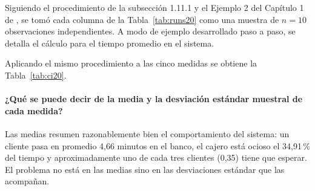 \documentclass[11pt,letterpaper]{article}
\begin{document}
Siguiendo el procedimiento de la subsección 1.11.1 y el Ejemplo 2 del Capítulo 1 de \cite{Banks1998}, se tomó cada columna de la Tabla~\ref{tab:runs20} como una muestra de $n = 10$ observaciones independientes. A modo de ejemplo desarrollado paso a paso, se detalla el cálculo para el tiempo promedio en el sistema.

\vspace{4pt}
\noindent{}
\vspace{6pt}

Aplicando el mismo procedimiento a las cinco medidas se obtiene la Tabla~\ref{tab:ci20}.



\paragraph{¿Qué se puede decir de la media y la desviación estándar muestral de cada medida?}

Las medias resumen razonablemente bien el comportamiento del sistema: un cliente pasa en promedio 4,66 minutos en el banco, el cajero está ocioso el 34,91\,\% del tiempo y aproximadamente uno de cada tres clientes (0,35) tiene que esperar. El problema no está en las medias sino en las desviaciones estándar que las acompañan.
\end{document}
